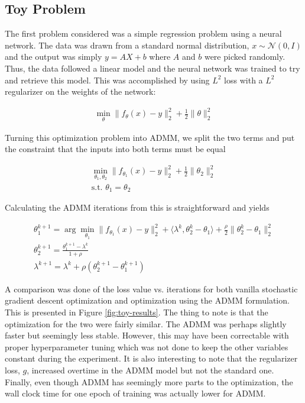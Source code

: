 \documentclass{article}
\begin{document}
  \subsection{Toy Problem}

  The first problem considered was a simple regression problem using a neural network. The data was drawn from a standard normal distribution, $x \sim \mathcal{N}(0, I)$ and the output was simply $y = AX + b$ where $A$ and $b$ were picked randomly. Thus, the data followed a linear model and the neural network was trained to try and retrieve this model. This was accomplished by using $L^2$ loss with a $L^2$ regularizer on the weights of the network:

  \begin{gather*}
    \min_\theta \lVert f_\theta (x) - y \rVert_2^2 + \frac{1}{2} \lVert \theta \rVert_2^2
  \end{gather*}

  Turning this optimization problem into ADMM, we split the two terms and put the constraint that the inputs into both terms must be equal

  \begin{gather*}
    \min_{\theta_1, \theta_2} \lVert f_{\theta_1} (x) - y\rVert_2^2 + \frac{1}{2} \lVert \theta_2 \rVert_2^2 \\
    \text{s.t. } \theta_1 = \theta_2
  \end{gather*}

  Calculating the ADMM iterations from this is straightforward and yields

  \begin{gather*}
    \theta_1^{k+1} = \arg\min_{\theta_1} \lVert f_{\theta_1}(x) - y \rVert_2^2 + \langle \lambda^k, \theta_2^k - \theta_1 \rangle + \frac{\rho}{2} \lVert \theta_2^k - \theta_1 \rVert_2^2 \\
    \theta_2^{k+1} = \frac{\theta_1^{k+1} - \lambda^k}{1 + \rho} \\
    \lambda^{k+1} = \lambda^k + \rho (\theta_2^{k+1} - \theta_1^{k+1})
  \end{gather*}

  A comparison was done of the loss value vs. iterations for both vanilla stochastic gradient descent optimization and optimization using the ADMM formulation. This is presented in Figure \ref{fig:toy-results}. The thing to note is that the optimization for the two were fairly similar. The ADMM was perhaps slightly faster but seemingly less stable. However, this may have been correctable with proper hyperparameter tuning which was not done to keep the other variables constant during the experiment. It is also interesting to note that the regularizer loss, $g$, increased overtime in the ADMM model but not the standard one. Finally, even though ADMM has seemingly more parts to the optimization, the wall clock time for one epoch of training was actually lower for ADMM.
\end{document}
